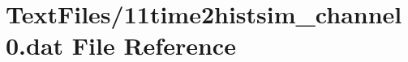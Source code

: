 \hypertarget{11time2histsim__channel0_8dat}{}\section{Text\+Files/11time2histsim\+\_\+channel0.dat File Reference}
\label{11time2histsim__channel0_8dat}
